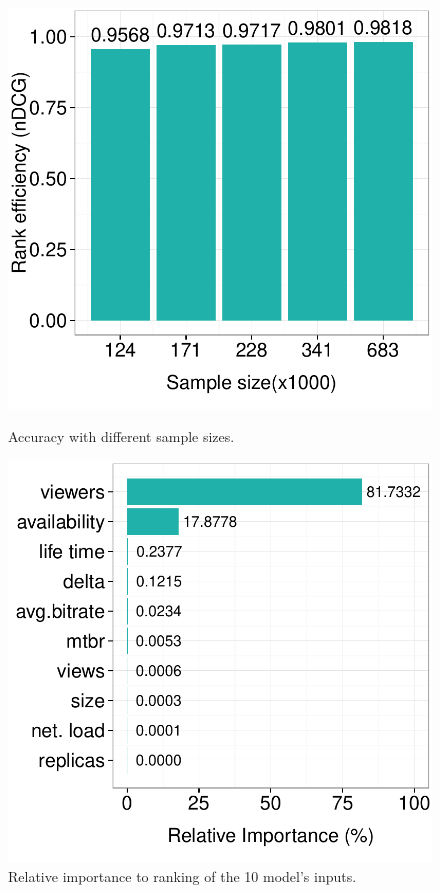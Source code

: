 \begin{figure}[htbp]
	\begin{minipage}[t]{0.48\linewidth}
     \includegraphics[width=.9\textwidth]{inputs/img/sample_size}
		\caption{Accuracy with different sample sizes.}
		\label{fig:sample_size}
	\end{minipage}
	\hspace{0.1cm}
	\begin{minipage}[t]{0.48\linewidth}
		\includegraphics[width=.9\textwidth]{inputs/img/feature_importance}
		\caption{Relative importance to ranking of the 10 model's inputs.}
		\label{fig:feature_importance}
	\end{minipage}
\end{figure}

